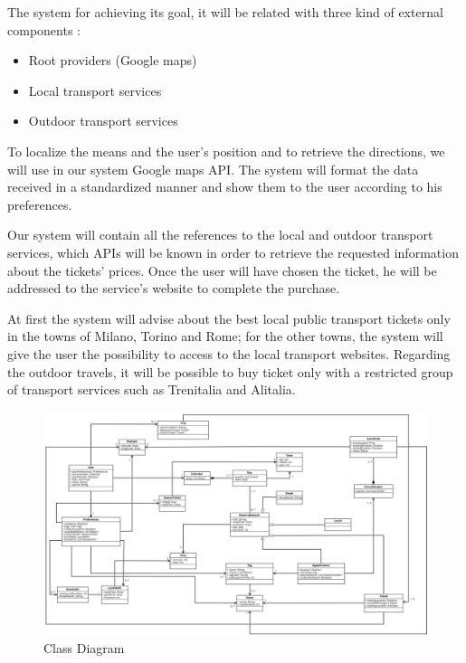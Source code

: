 \vspace*{-5mm}

The system for achieving its goal, it will be related with three kind of external components :
\begin{itemize}
	\setlength{\leftskip}{0.5cm}
	\item Root providers (Google maps)
	\item Local transport services
	\item Outdoor transport services
\end{itemize}
To localize the means and the user’s position and to retrieve the directions, we will use in our system Google maps API. The system will format the data received in a standardized manner and show them to the user according to his preferences.\par
Our system will contain all the references to the local and outdoor transport services, which APIs will be known in order to retrieve the requested information about the tickets’ prices. 
Once the user will have chosen the ticket, he will be addressed to the service’s website to complete the purchase.\par
At first the system will advise about the best local public transport tickets only in the towns of Milano, Torino and Rome; for the other towns, the system will give the user the possibility to access to the local transport websites.
Regarding the outdoor travels, it will be possible to buy ticket only with a restricted group of transport services such as Trenitalia and Alitalia.
\begin{figure}[H]
	\centering
	\includegraphics[scale=0.25]{Images/Class_Diagram}
	\caption{Class Diagram}
\end{figure}

